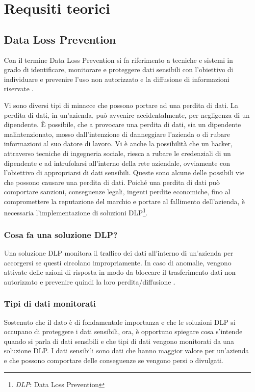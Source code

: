 \chapter{Requsiti teorici}

\section{Data Loss Prevention}
Con il termine Data Loss Prevention si fa riferimento a 
tecniche e sistemi in grado di identificare, monitorare 
e proteggere dati sensibili con l’obiettivo di individuare 
e prevenire l’uso non autorizzato e la diffusione di informazioni riservate \cite{DLP1}. 

Vi sono diversi tipi di minacce che possono portare ad una perdita di dati.
La perdita di dati, in un'azienda, può avvenire accidentalmente, per negligenza di un 
dipendente. È possibile, che a provocare una perdita di dati, sia un dipendente malintenzionato,
mosso dall'intenzione di danneggiare l'azienda o di rubare informazioni al suo datore di lavoro.
Vi è anche la possibilità che un hacker, attraverso tecniche di ingegneria sociale, riesca a rubare
le credenziali di un dipendente e ad intrufolarsi all'interno della rete aziendale, ovviamente con 
l'obiettivo di appropriarsi di dati sensibili.
Queste sono alcune delle possibili vie che possono causare una perdita di dati. Poiché una perdita di dati
può comportare sanzioni, conseguenze legali, ingenti perdite economiche, fino al compromettere la reputazione del 
marchio e portare al fallimento dell'azienda, è necessaria l'implementazione di soluzioni
DLP\footnote{\textit{DLP}: Data Loss Prevention}.
 

\subsection{Cosa fa una soluzione DLP?}
    Una soluzione DLP monitora il traffico dei dati all'interno di un'azienda per accorgersi se
    questi circolano impropriamente. In caso di anomalie, vengono attivate delle azioni di risposta 
    in modo da bloccare il trasferimento dati non autorizzato e prevenire quindi la loro perdita/diffusione \cite{DLP2}.
    


\subsection{Tipi di dati monitorati}
    Sostenuto che il dato è di fondamentale importanza e che le soluzioni DLP si occupano di proteggere i dati sensibili,
    ora, è opportuno spiegare cosa s'intende quando si parla di dati sensibili e che tipi di dati vengono monitorati 
    da una soluzione DLP. I dati sensibili sono dati che hanno maggior valore per un'azienda e che possono comportare 
    delle conseguenze se vengono persi o divulgati.

